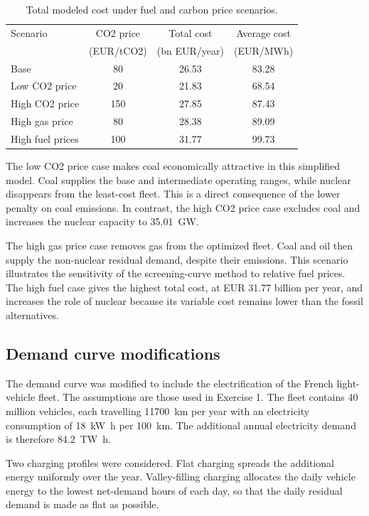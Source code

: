 \documentclass[a4paper]{report}
\begin{document}
\begin{table}[H]
  \centering
  \caption{Total modeled cost under fuel and carbon price scenarios.}
  \label{tab:exercise5-price-cost}
  \begin{tabular}{lccc}
    \toprule
    Scenario & CO2 price & Total cost & Average cost \\
    & (EUR/tCO2) & (bn EUR/year) & (EUR/MWh) \\
    \midrule
    Base & 80 & 26.53 & 83.28 \\
    Low CO2 price & 20 & 21.83 & 68.54 \\
    High CO2 price & 150 & 27.85 & 87.43 \\
    High gas price & 80 & 28.38 & 89.09 \\
    High fuel prices & 100 & 31.77 & 99.73 \\
    \bottomrule
  \end{tabular}
\end{table}

The low CO2 price case makes coal economically attractive in this simplified model. Coal supplies the base and intermediate operating ranges, while nuclear disappears from the least-cost fleet. This is a direct consequence of the lower penalty on coal emissions. In contrast, the high CO2 price case excludes coal and increases the nuclear capacity to \SI{35.01}{\giga\watt}.

The high gas price case removes gas from the optimized fleet. Coal and oil then supply the non-nuclear residual demand, despite their emissions. This scenario illustrates the sensitivity of the screening-curve method to relative fuel prices. The high fuel case gives the highest total cost, at EUR 31.77 billion per year, and increases the role of nuclear because its variable cost remains lower than the fossil alternatives.

\subsection{Demand curve modifications}

The demand curve was modified to include the electrification of the French light-vehicle fleet. The assumptions are those used in Exercise 1. The fleet contains 40 million vehicles, each travelling \SI{11700}{\kilo\meter} per year with an electricity consumption of \SI{18}{\kilo\watt\hour} per \SI{100}{\kilo\meter}. The additional annual electricity demand is therefore \SI{84.2}{\tera\watt\hour}.

Two charging profiles were considered. Flat charging spreads the additional energy uniformly over the year. Valley-filling charging allocates the daily vehicle energy to the lowest net-demand hours of each day, so that the daily residual demand is made as flat as possible.
\end{document}

